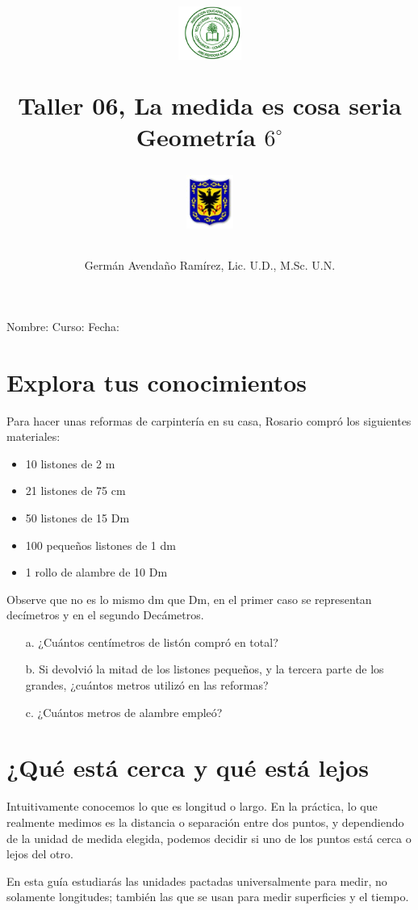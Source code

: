 \documentclass[letterpaper,11pt,twoside]{article}
\author{Germ\'an Avenda\~no Ram\'irez, Lic. U.D., M.Sc. U.N.}
\title{\begin{minipage}{.2\textwidth}
\includegraphics[height=1.75cm]{Images/logo-colegio.png}\end{minipage}
\begin{minipage}{.55\textwidth}
\begin{center}
Taller 06, La medida es cosa seria\\
Geometría $6^{\circ}$
\end{center}
\end{minipage}\hfill
\begin{minipage}{.2\textwidth}
\includegraphics[height=1.75cm]{Images/logo-sed.png} 
\end{minipage}}
\date{}
\begin{document}
\maketitle
Nombre: \hrulefill Curso: \underline{\hspace*{44pt}} Fecha: \underline{\hspace*{2.5cm}}
\begin{multicols}{2}
 \section*{Explora tus conocimientos}
 Para hacer unas reformas de carpintería en su casa, Rosario compró los siguientes materiales:
\begin{itemize}
\item 10 listones de 2 m
\item 21 listones de 75 cm
\item 50 listones de 15 Dm
\item 100 pequeños listones de 1 dm
\item 1 rollo de alambre de 10 Dm
\end{itemize}
Observe que no es lo mismo dm que Dm, en el primer caso se representan decímetros y en el segundo Decámetros.
\begin{itemize}
\item[a.] ¿Cuántos centímetros de listón compró en total?
\item[b.] Si devolvió la mitad de los listones pequeños, y la tercera parte de los grandes, ¿cuántos metros utilizó en las reformas?
\item[c.] ¿Cuántos metros de alambre empleó?
\end{itemize}
\section*{¿Qué est\'{a} cerca y qu\'{e} est\'{a} lejos}
Intuitivamente conocemos lo que es longitud o largo. En la práctica, lo que realmente medimos es la distancia o separación entre dos puntos, y dependiendo de la unidad de medida elegida, podemos decidir si uno de los puntos está cerca o lejos del otro.

En esta guía estudiarás las unidades pactadas universalmente para medir, no solamente longitudes; también las que se usan para medir superficies y el tiempo.

\end{multicols}
\end{document}
